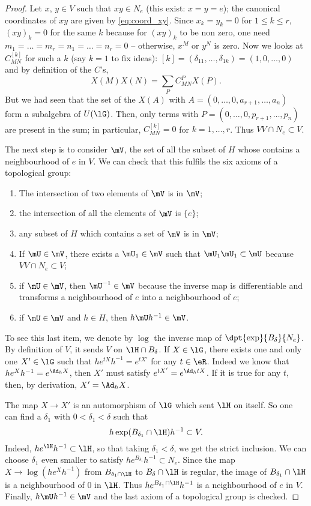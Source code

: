 \begin{proof}
	Let $x$, $y\in V$ such that $xy\in N_e$ (this exist: $x=y=e$); the canonical coordinates of $xy$ are given by \eqref{eq:coord_xy}. Since $x_k=y_k=0$ for $1\leq k\leq r$, $(xy)_k=0$ for the same $k$ because for $(xy)_k$ to be non zero, one need $m_1=\ldots=m_r=n_1=\ldots=n_r=0$ -- otherwise, $x^M$ or $y^N$ is zero. Now we looks at $C^{[k]}_{MN}$ for such a $k$ (say $k=1$ to fix ideas): $[k]=(\delta_{11},\ldots,\delta_{1k})=(1,0,\ldots,0)$ and by definition of the $C$'s,
	\[
		X(M)X(N)=\sum_PC_{MN}^PX(P).
	\]
	But we had seen that the set of the $X(A)$ with $A=(0,\ldots,0,a_{r+1},\ldots,a_n)$ form a subalgebra of $U(\lG)$. Then, only terms with $P=(0,\ldots,0,p_{r+1},\ldots,p_n)$ are present in the sum; in particular, $C_{MN}^{[k]}=0$ for $k=1,\ldots,r$. Thus $VV\cap N_e\subset V$.

	The next step is to consider $\mV$, the set of all the subset of $H$ whose contains a neighbourhood of $e$ in $V$. We can check that this fulfils the six axioms of a topological group:

	\begin{enumerate}
		\item The intersection of two elements of $\mV$ is in $\mV$;
		\item the intersection of all the elements of $\mV$ is $\{e\}$;
		\item any subset of $H$ which contains a set of $\mV$ is in $\mV$;
		\item If $\mU\in\mV$, there exists a $\mU_1\in\mV$ such that $\mU_1\mU_1\subset\mU$ because $VV\cap N_e\subset V$;
		\item if $\mU\in\mV$, then $\mU^{-1}\in\mV$ because the inverse map is differentiable and transforms a neighbourhood of $e$ into a neighbourhood of $e$;
		\item if $\mU\in\mV$ and $h\in H$, then $h\mU h^{-1}\in\mV$.
	\end{enumerate}

	To see this last item, we denote by $\log$ the inverse map of $\dpt{\exp}{B_{\delta}}{N_e}$. By definition of $V$, it sends $V$ on $\lH\cap B_{\delta}$. If $X\in\lG$, there exists one and only one $X'\in\lG$ such that $he^{tX}h^{-1}=e^{tX'}$ for any $t\in\eR$. Indeed we know that $he^{X}h^{-1}=e^{\Ad_hX}$, then $X'$ must satisfy $e^{tX'}=e^{\Ad_htX}$. If it is true for any $t$, then, by derivation, $X'=\Ad_hX$.

	The map $X\to X'$ is an automorphism of $\lG$ which sent $\lH$ on itself. So one can find a $\delta_1$ with $0<\delta_1<\delta$ such that
	\[
		h\exp({B_{\delta_1}\cap\lH})h^{-1}\subset V.
	\]
	Indeed, $he^{\lH} h^{-1}\subset\lH$, so that taking $\delta_1<\delta$, we get the strict inclusion. We can choose $\delta_1$ even smaller to satisfy $he^{B_{\delta_1}}h^{-1}\subset N_e$. Since the map $X\to\log(he^{X}h^{-1})$ from $B_{\delta_1\cap\lH}$ to $B_{\delta}\cap\lH$ is regular, the image of $B_{\delta_1}\cap\lH$ is a neighbourhood of $0$ in $\lH$. Thus $he^{B_{\delta_1}\cap\lH}h^{-1}$ is a neighbourhood of $e$ in $V$. Finally, $h\mU h^{-1}\in\mV$ and the last axiom of a topological group is checked.


\end{proof}
